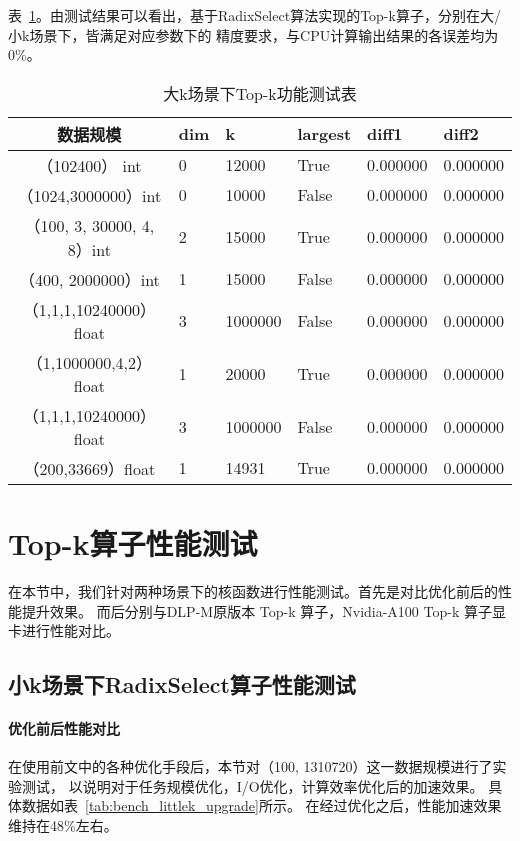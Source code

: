 表~\ref{tab:presicionbigk}。由测试结果可以看出，基于RadixSelect算法实现的Top-k算子，分别在大/小k场景下，皆满足对应参数下的
精度要求，与CPU计算输出结果的各误差均为0\%。
\begin{table}
    \centering
    \caption{大k场景下Top-k功能测试表}
    \label{tab:presicionbigk}
    \begin{tabular}{clllll}
        \toprule
        数据规模       &dim  & k  & largest & diff1    & diff2 \\
        \midrule
        （102400） int&0&  12000     & True      & 0.000000 & 0.000000 \\
        （1024,3000000）int&0 & 10000 & False      & 0.000000 & 0.000000 \\
        （100, 3, 30000, 4, 8）int&2 & 15000 & True      & 0.000000 & 0.000000 \\
        （400, 2000000）int&1 & 15000 & False      & 0.000000 & 0.000000 \\
        
        （1,1,1,10240000）float &3& 1000000 & False      & 0.000000 & 0.000000 \\
        （1,1000000,4,2）float  &1 & 20000 & True      & 0.000000 & 0.000000 \\
        （1,1,1,10240000）float&3 & 1000000 & False      & 0.000000 & 0.000000 \\
        （200,33669）float&1 & 14931 & True      & 0.000000 & 0.000000 \\
    
    \bottomrule
    \end{tabular}
    \end{table}

\section{Top-k算子性能测试}
在本节中，我们针对两种场景下的核函数进行性能测试。首先是对比优化前后的性能提升效果。
而后分别与DLP-M原版本 Top-k 算子，Nvidia-A100 Top-k 算子显卡进行性能对比。
\subsection{小k场景下RadixSelect算子性能测试}
\paragraph{优化前后性能对比}
在使用前文中的各种优化手段后，本节对（100, 1310720）这一数据规模进行了实验测试，
以说明对于任务规模优化，I/O优化，计算效率优化后的加速效果。
具体数据如表~\ref{tab:bench_littlek_upgrade}所示。
在经过优化之后，性能加速效果维持在48\%左右。

